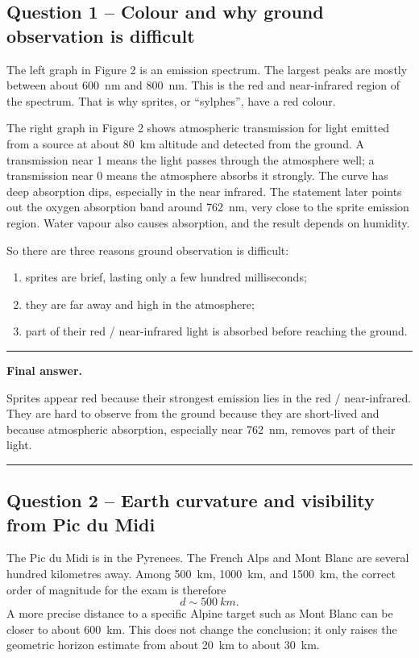 \documentclass[11pt,a4paper]{article}
\newenvironment{finalanswer}{%
  \begin{center}\begin{minipage}{0.94\linewidth}\hrule\vspace{0.45em}\textbf{Final answer. }%
}{%
  \vspace{0.45em}\hrule\end{minipage}\end{center}%
}
\begin{document}
\subsection*{Question 1 -- Colour and why ground observation is difficult}

The left graph in Figure 2 is an emission spectrum. The largest peaks are mostly between about \SI{600}{nm} and \SI{800}{nm}. This is the red and near-infrared region of the spectrum. That is why sprites, or ``sylphes'', have a red colour.

The right graph in Figure 2 shows atmospheric transmission for light emitted from a source at about \SI{80}{km} altitude and detected from the ground. A transmission near 1 means the light passes through the atmosphere well; a transmission near 0 means the atmosphere absorbs it strongly. The curve has deep absorption dips, especially in the near infrared. The statement later points out the oxygen absorption band around \SI{762}{nm}, very close to the sprite emission region. Water vapour also causes absorption, and the result depends on humidity.

So there are three reasons ground observation is difficult:
\begin{enumerate}[label=\arabic*)]
\item sprites are brief, lasting only a few hundred milliseconds;
\item they are far away and high in the atmosphere;
\item part of their red / near-infrared light is absorbed before reaching the ground.
\end{enumerate}

\begin{finalanswer}
Sprites appear red because their strongest emission lies in the red / near-infrared. They are hard to observe from the ground because they are short-lived and because atmospheric absorption, especially near \SI{762}{nm}, removes part of their light.
\end{finalanswer}

\subsection*{Question 2 -- Earth curvature and visibility from Pic du Midi}

The Pic du Midi is in the Pyrenees. The French Alps and Mont Blanc are several hundred kilometres away. Among \SI{500}{km}, \SI{1000}{km}, and \SI{1500}{km}, the correct order of magnitude for the exam is therefore
\[
 d\sim\SI{500}{km}.
\]
A more precise distance to a specific Alpine target such as Mont Blanc can be closer to about \SI{600}{km}. This does not change the conclusion; it only raises the geometric horizon estimate from about \SI{20}{km} to about \SI{30}{km}.
\end{document}
